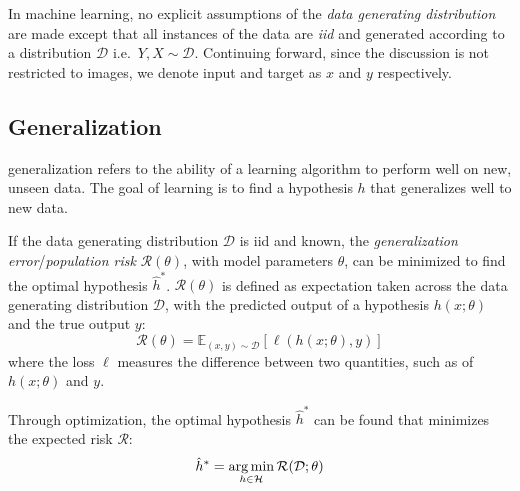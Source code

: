 In machine learning, no explicit assumptions  of the \textit{data generating distribution} are made except that all instances of the data are \textit{\gls{iid}} and generated according to a distribution $\mathcal{D}$ i.e.\ $Y, X \sim \mathcal{D}$. Continuing forward, since the discussion is not restricted to images, we denote input and target as $x$ and $y$ respectively. 

\subsection{Generalization}\label{sec:generalization}
\Gls{generalization} refers to the ability of a learning algorithm to perform well on new, unseen data. The goal of learning is to find a hypothesis $h$ that generalizes well to new data. 

If the data generating distribution $\mathcal{D}$ is \gls{iid} and known, the \textit{generalization error}/\textit{population risk} $\mathcal{R}(\theta)$, with model parameters $\theta$, can be minimized to find the optimal hypothesis $\hat{h}^*$. $\mathcal{R}(\theta)$ is defined as expectation taken across the data generating distribution $\mathcal{D}$, with the predicted output of a hypothesis $h(x; \theta)$ and the true output $y$:
\begin{equation}\label{eq:risk}
    \mathcal{R}(\theta) = \mathbb{E}_{(x, y) \sim \mathcal{D}} \left[ \ell(h(x; \theta), y) \right]
\end{equation}
where the loss $\ell$ measures the difference between two quantities, such as of $h(x; \theta)$ and $y$.

Through optimization, the optimal hypothesis $\hat{h}^*$  can be found that minimizes the expected risk $\mathcal{R}$:
\begin{equation}\label{eq:risk-min}
    \hat{h}^* = \operatorname*{arg\,min}_{h \in \mathcal{H}} \mathcal{R}(\mathcal{D}; \theta)
\end{equation}

